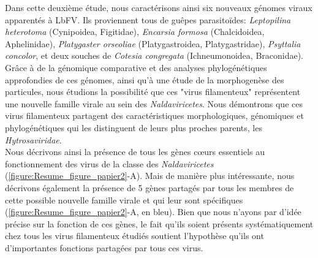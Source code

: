 Dans cette deuxième étude, nous caractérisons ainsi six nouveaux génomes viraux apparentés à LbFV. Ils proviennent tous de guêpes parasitoïdes: \textit{Leptopilina heterotoma} (Cynipoidea, Figitidae), \textit{Encarsia formosa} (Chalcidoidea, Aphelinidae), \textit{Platygaster orseoliae} (Platygastroidea, Platygastridae), \textit{Psyttalia concolor}, et deux souches de \textit{Cotesia congregata}  (Ichneumonoidea, Braconidae). Grâce à de la génomique comparative et des analyses phylogénétiques approfondies de ces génomes, ainsi qu'à une étude de la morphogenèse des particules, nous étudions la possibilité que ces "virus filamenteux" représentent une nouvelle famille virale au sein des \textit{Naldaviricetes}. Nous démontrons que ces virus filamenteux partagent des caractéristiques morphologiques, génomiques et phylogénétiques qui les distinguent de leurs plus proches parents, les \textit{Hytrosaviridae}. \\

Nous décrivons ainsi la présence de tous les gènes cœurs essentiels au fonctionnement des virus de la classe des \textit{Naldaviricetes} (\figurename{\ref{figure:Resume_figure_papier2}}-A). Mais de manière plus intéressante, nous décrivons également la présence de 5 gènes partagés par tous les membres de cette possible nouvelle famille virale et qui leur sont spécifiques (\figurename{\ref{figure:Resume_figure_papier2}}-A, en bleu). Bien que nous n'ayons par d'idée précise sur la fonction de ces gènes, le fait qu'ils soient présents systématiquement chez tous les virus filamenteux étudiés soutient l'hypothèse qu'ils ont d'importantes fonctions partagées par tous ces virus. \\


